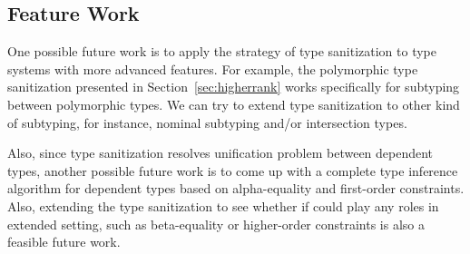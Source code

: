 \subsection{Feature Work}

One possible future work is to apply the strategy of type sanitization to type
systems with more advanced features. For example, the polymorphic type
sanitization presented in Section~\ref{sec:higherrank} works specifically for
subtyping between polymorphic types. We can try to extend type sanitization to
other kind of subtyping, for instance, nominal subtyping and/or intersection
types.

Also, since type sanitization resolves unification problem between dependent
types, another possible future work is to come up with a complete type inference
algorithm for dependent types based on alpha-equality and first-order
constraints. Also, extending the type sanitization to see whether if could play
any roles in extended setting, such as beta-equality or higher-order constraints
is also a feasible future work.
